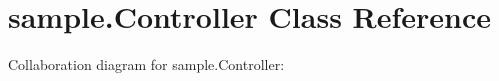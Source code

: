\hypertarget{classsample_1_1Controller}{}\section{sample.\+Controller Class Reference}
\label{classsample_1_1Controller}


Collaboration diagram for sample.\+Controller\+:
